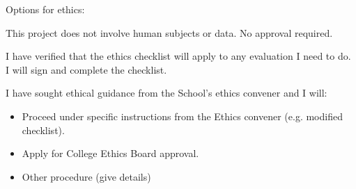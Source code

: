 \documentclass[11pt]{article}
\begin{document}
Options for ethics:
\item This project does not involve human subjects or data. No approval required.
\item I have verified that the ethics checklist will apply to any evaluation I need to do. I will sign and complete the checklist.
\item I have sought ethical guidance from the School's ethics convener and I will:
\begin{itemize}
    \item Proceed under specific instructions from the Ethics convener (e.g. modified checklist).
    \item Apply for College Ethics Board approval.
    \item Other procedure (give details)
\end{itemize}    
\end{document}
